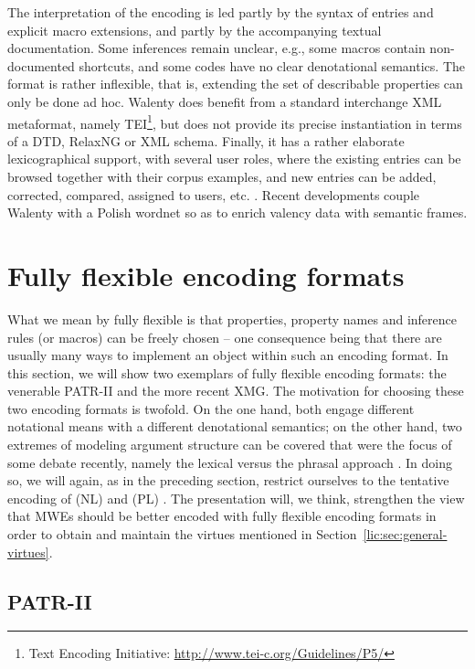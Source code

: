 \documentclass[output=paper]{langsci/langscibook}
\begin{document}
The interpretation of the encoding is led partly by the syntax of entries and explicit macro extensions, and partly by the accompanying textual documentation. Some inferences remain unclear, e.g., some macros contain non-documented shortcuts, and some codes have no clear denotational semantics. The format is rather inflexible, that is, extending the set of describable properties can only be done ad hoc. Walenty does benefit from a standard interchange XML metaformat, namely TEI\footnote{Text Encoding Initiative: \url{http://www.tei-c.org/Guidelines/P5/}}, but does not provide its precise instantiation in terms of a DTD, RelaxNG or XML schema. Finally, it has a rather elaborate lexicographical support, with several user roles, where the existing entries can be browsed together with their corpus examples, and new entries can be added, corrected, compared, assigned to users, etc. \citep{nit:etal:16}. Recent developments couple Walenty with a Polish wordnet so as to enrich valency data with semantic frames. 

%
\section{Fully flexible encoding formats}
\label{lic:sec:fullyflexible}

What we mean by fully flexible is that properties, property names and inference rules (or macros) can
be freely chosen -- one consequence being that there are usually many ways to implement an object within such an encoding format. In this section, we will show two exemplars of fully flexible encoding formats: the venerable PATR-II and  the more recent XMG. The motivation for choosing these two encoding formats is twofold. On the one hand, both engage different notational means with a different denotational semantics; on the other hand, two extremes of modeling argument structure can be covered that were the focus of some debate recently, namely the lexical versus the phrasal approach \citep{mueller:wechsler:14}. In doing so, we will again, as in the preceding section, restrict ourselves to the tentative encoding of (NL)  and (PL) . The presentation will, we think, strengthen the view that MWEs should be better encoded with fully flexible encoding formats in order to obtain and maintain the virtues mentioned in Section~\ref{lic:sec:general-virtues}.   

\subsection{PATR-II}
\label{lic:sec:patr-datr}
\end{document}
